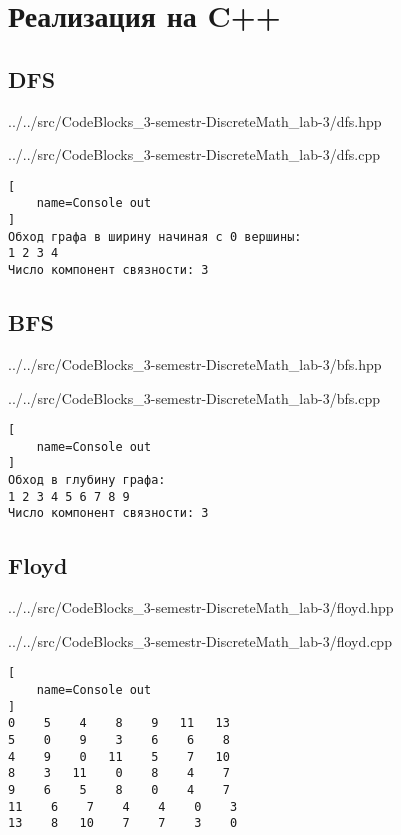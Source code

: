 \newpage


\section{Реализация на C++}

\newpage

\subsection{DFS}


{../../src/CodeBlocks_3-semestr-DiscreteMath_lab-3/dfs.hpp}


{../../src/CodeBlocks_3-semestr-DiscreteMath_lab-3/dfs.cpp}

\begin{lstlisting}[
    name=Console out
]
Обход графа в ширину начиная с 0 вершины: 
1 2 3 4 
Число компонент связности: 3
\end{lstlisting}

\newpage

\subsection{BFS}


{../../src/CodeBlocks_3-semestr-DiscreteMath_lab-3/bfs.hpp}


{../../src/CodeBlocks_3-semestr-DiscreteMath_lab-3/bfs.cpp}

\begin{lstlisting}[
    name=Console out
]
Обход в глубину графа:
1 2 3 4 5 6 7 8 9 
Число компонент связности: 3
\end{lstlisting}

\newpage

\subsection{Floyd}


{../../src/CodeBlocks_3-semestr-DiscreteMath_lab-3/floyd.hpp}


{../../src/CodeBlocks_3-semestr-DiscreteMath_lab-3/floyd.cpp}

\begin{lstlisting}[
    name=Console out
]
0    5    4    8    9   11   13 
5    0    9    3    6    6    8 
4    9    0   11    5    7   10 
8    3   11    0    8    4    7 
9    6    5    8    0    4    7 
11    6    7    4    4    0    3 
13    8   10    7    7    3    0 
\end{lstlisting}

